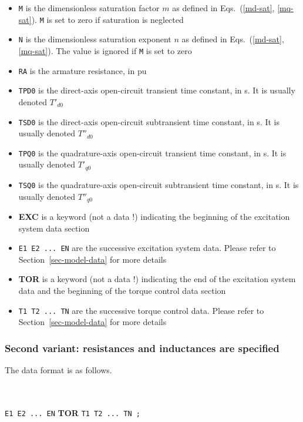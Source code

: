 \begin{itemize}
\item {\tt M} is the dimensionless saturation factor $m$ as defined in Eqs.~(\ref{md-sat}, \ref{mq-sat}). {\tt M} is set to zero if saturation is neglected
\item {\tt N} is the dimensionless saturation exponent $n$ as defined in Eqs.~(\ref{md-sat}, \ref{mq-sat}). The value is ignored if {\tt M} is set to zero
\item {\tt RA} is the armature resistance, in pu
\item {\tt TPD0} is the direct-axis open-circuit transient time constant, in s. It is usually denoted $T'_{d0}$
\item {\tt TSD0} is the direct-axis open-circuit subtransient time constant, in s. It is usually denoted $T''_{d0}$
\item {\tt TPQ0} is the quadrature-axis open-circuit transient time constant, in s. It is usually denoted $T'_{q0}$
\item {\tt TSQ0} is the quadrature-axis open-circuit subtransient time constant, in s. It is usually denoted $T''_{q0}$
\item {\bf EXC} is a keyword (not a data !) indicating the beginning of the excitation system data section
\item {\tt E1 E2 ...\ EN} are the successive excitation system data. Please refer to Section~\ref{sec-model-data} for more details
\item {\bf TOR} is a keyword (not a data !) indicating the end of the excitation system data and the beginning of the torque control data section
\item {\tt T1 T2 ...\ TN} are the successive torque control data. Please refer to Section~\ref{sec-model-data} for more details
\end{itemize}

\subsubsection*{Second variant: resistances and inductances are specified}

The data format is as follows.

\hspace*{5ex}{\tt SYNC\_MACH NAME BUS FP FQ P Q SNOM PNOM H D IBRATIO} \\
\hspace*{10ex}{\tt MOD\_TYPE LL MDU LLF LLD1 MQU LLQ1 LLQ2 M N RA RF RD1 RQ1 RQ2} \\
\hspace*{10ex}{\bf EXC} {\tt E1 E2 ...\ EN} \; {\bf TOR} {\tt T1 T2 ...\ TN ;}

